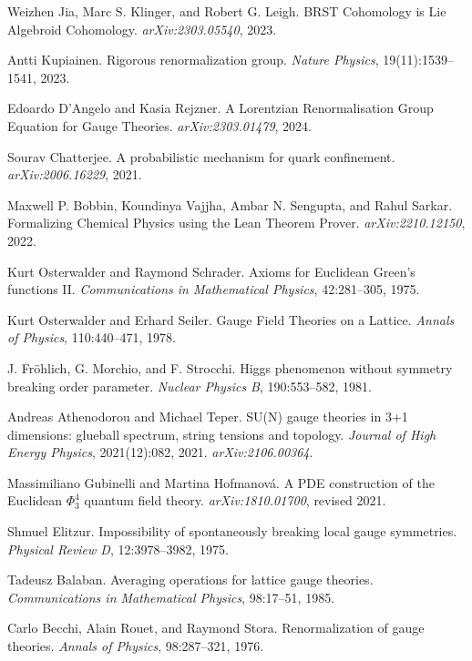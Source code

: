 \documentclass[11pt]{amsart}
\begin{document}
\begin{thebibliography}{99}
Weizhen Jia, Marc S. Klinger, and Robert G. Leigh.
BRST Cohomology is Lie Algebroid Cohomology.
\emph{arXiv:2303.05540}, 2023.

Antti Kupiainen.
Rigorous renormalization group.
\emph{Nature Physics}, 19(11):1539--1541, 2023.

Edoardo D'Angelo and Kasia Rejzner.
A Lorentzian Renormalisation Group Equation for Gauge Theories.
\emph{arXiv:2303.01479}, 2024.

Sourav Chatterjee.
A probabilistic mechanism for quark confinement.
\emph{arXiv:2006.16229}, 2021.

Maxwell P. Bobbin, Koundinya Vajjha, Ambar N. Sengupta, and Rahul Sarkar.
Formalizing Chemical Physics using the Lean Theorem Prover.
\emph{arXiv:2210.12150}, 2022.

Kurt Osterwalder and Raymond Schrader.
Axioms for Euclidean Green's functions II.
\emph{Communications in Mathematical Physics}, 42:281--305, 1975.

Kurt Osterwalder and Erhard Seiler.
Gauge Field Theories on a Lattice.
\emph{Annals of Physics}, 110:440--471, 1978.

J. Fröhlich, G. Morchio, and F. Strocchi.
Higgs phenomenon without symmetry breaking order parameter.
\emph{Nuclear Physics B}, 190:553--582, 1981.

Andreas Athenodorou and Michael Teper.
SU(N) gauge theories in 3+1 dimensions: glueball spectrum, string tensions and topology.
\emph{Journal of High Energy Physics}, 2021(12):082, 2021. \emph{arXiv:2106.00364}.

Massimiliano Gubinelli and Martina Hofmanová.
A PDE construction of the Euclidean $\Phi^4_3$ quantum field theory.
\emph{arXiv:1810.01700}, revised 2021.

Shmuel Elitzur.
Impossibility of spontaneously breaking local gauge symmetries.
\emph{Physical Review D}, 12:3978--3982, 1975.

Tadeusz Balaban.
Averaging operations for lattice gauge theories.
\emph{Communications in Mathematical Physics}, 98:17--51, 1985.

Carlo Becchi, Alain Rouet, and Raymond Stora.
Renormalization of gauge theories.
\emph{Annals of Physics}, 98:287--321, 1976.


\end{thebibliography}
\end{document}
